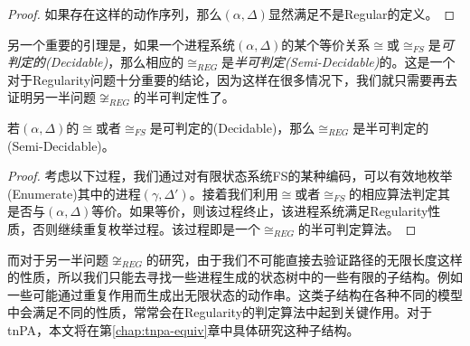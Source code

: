\begin{proof}
如果存在这样的动作序列，那么$(\alpha,\Delta)$显然满足不是Regular的定义。
\end{proof}

另一个重要的引理是，如果一个进程系统$(\alpha,\Delta)$的某个等价关系$\cong$或$\cong_{FS}$是\emph{可判定的(Decidable)}，那么相应的$\cong_{REG}$是\emph{半可判定(Semi-Decidable)}的。这是一个对于Regularity问题十分重要的结论，因为这样在很多情况下，我们就只需要再去证明另一半问题$\not\cong_{REG}$的半可判定性了。

\begin{lem}\label{lemma:semi-dec}
若$(\alpha,\Delta)$的$\cong$或者$\cong_{FS}$是可判定的(Decidable)，那么$\cong_{REG}$是半可判定的(Semi-Decidable)。
\end{lem}

\begin{proof}
考虑以下过程，我们通过对有限状态系统FS的某种编码，可以有效地枚举(Enumerate)其中的进程$(\gamma,\Delta')$。接着我们利用$\cong$或者$\cong_{FS}$的相应算法判定其是否与$(\alpha,\Delta)$等价。如果等价，则该过程终止，该进程系统满足Regularity性质，否则继续重复枚举过程。该过程即是一个$\cong_{REG}$的半可判定算法。
\end{proof}

而对于另一半问题$\not\cong_{REG}$的研究，由于我们不可能直接去验证路径的无限长度这样的性质，所以我们只能去寻找一些进程生成的状态树中的一些有限的子结构。例如一些可能通过重复作用而生成出无限状态的动作串。这类子结构在各种不同的模型中会满足不同的性质，常常会在Regularity的判定算法中起到关键作用。对于tnPA，本文将在第\ref{chap:tnpa-equiv}章中具体研究这种子结构。

